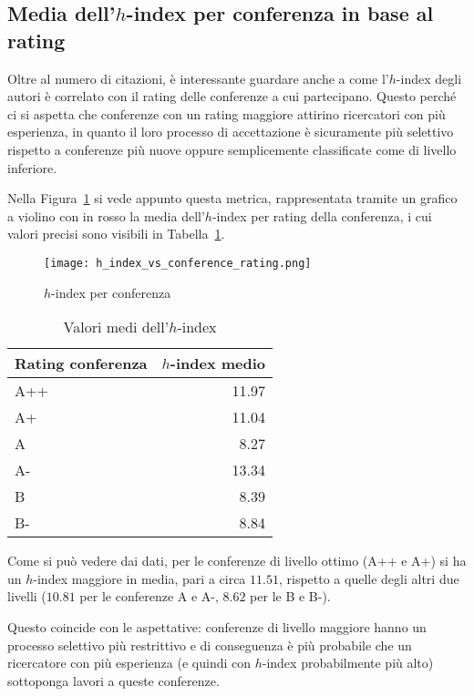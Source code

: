 \subsection{Media dell'$h$-index per conferenza in base al rating}

Oltre al numero di citazioni, è interessante guardare anche
a come l'$h$-index degli autori è correlato con il rating delle conferenze
a cui partecipano. Questo perché ci si aspetta che conferenze con un rating
maggiore attirino ricercatori con più esperienza, in quanto il loro
processo di accettazione è sicuramente più selettivo rispetto a conferenze
più nuove oppure semplicemente classificate come di livello inferiore.

Nella Figura~\ref{fig:h-index-vs-rating} si vede appunto questa metrica,
rappresentata tramite un grafico a violino con in rosso la media dell'$h$-index
per rating della conferenza, i cui valori precisi sono visibili in
Tabella~\ref{table:h-index-vs-rating}.

\begin{figure}[tb]
  \centering
  \texttt{[image: h\_index\_vs\_conference\_rating.png]}
  \caption{$h$-index per conferenza}
  \label{fig:h-index-vs-rating}
\end{figure}

\begin{table}[tb]
  \centering
  \begin{tabular}{||l|r||}
    \hline
    \textbf{Rating conferenza} & \textbf{$h$-index medio} \\ [0.5ex] 
    \hline\hline
    A++    & 11.97 \\ \hline
    A+     & 11.04 \\ \hline
    A      & 8.27  \\ \hline
    A-     & 13.34 \\ \hline
    B      & 8.39 \\ \hline
    B-     & 8.84 \\ \hline
  \end{tabular}
  \caption{Valori medi dell'$h$-index}
  \label{table:h-index-vs-rating}
\end{table}

Come si può vedere dai dati, per le conferenze di livello ottimo (A++ e A+)
si ha un $h$-index maggiore in media, pari a circa $11.51$, rispetto a quelle
degli altri due livelli ($10.81$ per le conferenze A e A-, $8.62$ per le B e
B-).

Questo coincide con le aspettative: conferenze di livello maggiore hanno
un processo selettivo più restrittivo e di conseguenza è più probabile
che un ricercatore con più esperienza (e quindi con $h$-index probabilmente
più alto) sottoponga lavori a queste conferenze.

